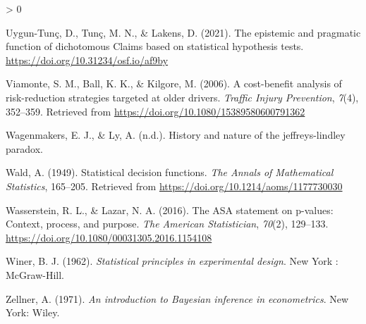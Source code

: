 \documentclass[
  english,
  ,man, a4paper,floatsintext]{apa6}
\newlength{\cslhangindent}
\newenvironment{CSLReferences}[2] %
 {%
  \setlength{\parindent}{0pt}
  \ifodd #1 \everypar{\setlength{\hangindent}{\cslhangindent}}\ignorespaces\fi
  \ifnum #2 > 0
  \setlength{\parskip}{#2\baselineskip}
  \fi
 }%
 {}
\begin{document}
\begin{CSLReferences}{1}{0}
\leavevmode\hypertarget{ref-tunc_epistemic_2021}{}%
Uygun-Tunç, D., Tunç, M. N., \& Lakens, D. (2021). The epistemic and pragmatic function of dichotomous {Claims} based on statistical hypothesis tests. \url{https://doi.org/10.31234/osf.io/af9by}

\leavevmode\hypertarget{ref-viamonte2006cost}{}%
Viamonte, S. M., Ball, K. K., \& Kilgore, M. (2006). A cost-benefit analysis of risk-reduction strategies targeted at older drivers. \emph{Traffic Injury Prevention}, \emph{7}(4), 352--359. Retrieved from \url{https://doi.org/10.1080/15389580600791362}

\leavevmode\hypertarget{ref-WagenmakersJeffreys}{}%
Wagenmakers, E. J., \& Ly, A. (n.d.). History and nature of the jeffreys-lindley paradox.

\leavevmode\hypertarget{ref-wald1949statistical}{}%
Wald, A. (1949). Statistical decision functions. \emph{The Annals of Mathematical Statistics}, 165--205. Retrieved from \url{https://doi.org/10.1214/aoms/1177730030}

\leavevmode\hypertarget{ref-wasserstein2016asa}{}%
Wasserstein, R. L., \& Lazar, N. A. (2016). The ASA statement on p-values: Context, process, and purpose. \emph{The American Statistician}, \emph{70}(2), 129--133. \url{https://doi.org/10.1080/00031305.2016.1154108}

\leavevmode\hypertarget{ref-winer_statistical_1962}{}%
Winer, B. J. (1962). \emph{Statistical principles in experimental design}. {New York : McGraw-Hill}.

\leavevmode\hypertarget{ref-zellner_introduction_1971}{}%
Zellner, A. (1971). \emph{An introduction to {Bayesian} inference in econometrics}. {New York}: {Wiley}.

\end{CSLReferences}

\endgroup
\end{document}
